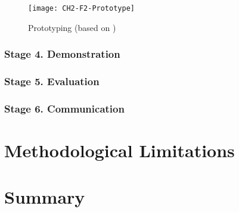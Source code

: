 \begin{figure}[htb]
\centering
\texttt{[image: CH2-F2-Prototype]}
\caption[Ptototyping]{Prototyping (based on \citet*[p.~411]{Sommerville2007})}
\label{fig:prototype}
\end{figure}

\subsubsection{Stage 4. Demonstration}

\subsubsection{Stage 5. Evaluation}

\subsubsection{Stage 6. Communication}

\section{Methodological Limitations}

\section{Summary}